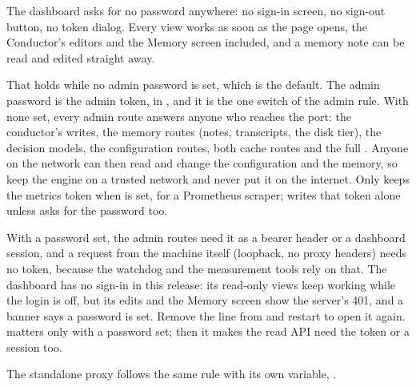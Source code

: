 The dashboard asks for no password anywhere: no sign-in screen, no sign-out button, no token dialog. Every view works as soon as the page opens, the Conductor's editors and the Memory screen included, and a memory note can be read and edited straight away.

That holds while no admin password is set, which is the default. The admin password is the admin token,  in , and it is the one switch of the admin rule. With none set, every admin route answers anyone who reaches the port: the conductor's writes, the memory routes (notes, transcripts, the disk tier), the decision models, the configuration routes, both cache routes and the full . Anyone on the network can then read and change the configuration and the memory, so keep the engine on a trusted network and never put it on the internet. Only  keeps the metrics token when  is set, for a Prometheus scraper;  writes that token alone unless  asks for the password too.

With a password set, the admin routes need it as a bearer header or a dashboard session, and a request from the machine itself (loopback, no proxy headers) needs no token, because the watchdog and the measurement tools rely on that. The dashboard has no sign-in in this release: its read-only views keep working while the login is off, but its edits and the Memory screen show the server's 401, and a banner says a password is set. Remove the line from  and restart to open it again.  matters only with a password set; then it makes the read API need the token or a session too.

The standalone proxy follows the same rule with its own variable, .
